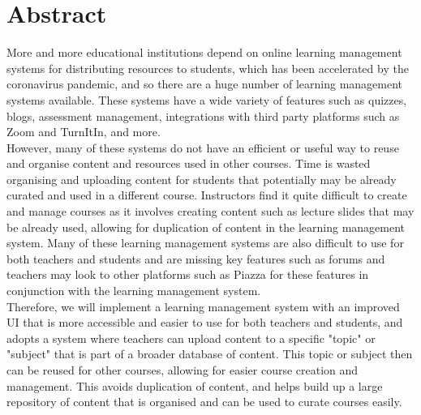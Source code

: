 \chapter*{Abstract}\label{abstract}
More and more educational institutions depend on online learning management systems for distributing resources to students, which has been accelerated by the coronavirus pandemic, and so there are a huge number of learning management systems available. These systems have a wide variety of features such as quizzes, blogs, assessment management, integrations with third party platforms such as Zoom and TurnItIn, and more. \\

However, many of these systems do not have an efficient or useful way to reuse and organise content and resources used in other courses. Time is wasted organising and uploading content for students that potentially may be already curated and used in a different course. Instructors find it quite difficult to create and manage courses as it involves creating content such as lecture slides that may be already used, allowing for duplication of content in the learning management system. Many of these learning management systems are also difficult to use for both teachers and students and are missing key features such as forums and teachers may look to other platforms such as Piazza for these features in conjunction with the learning management system. \\

Therefore, we will implement a learning management system with an improved UI that is more accessible and easier to use for both teachers and students, and adopts a system where teachers can upload content to a specific "topic" or "subject" that is part of a broader database of content. This topic or subject then can be reused for other courses, allowing for easier course creation and management. This avoids duplication of content, and helps build up a large repository of content that is organised and can be used to curate courses easily.